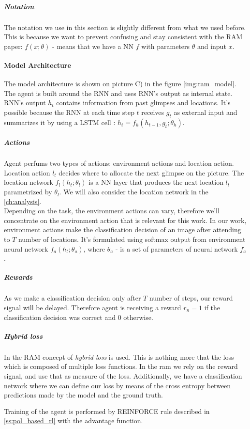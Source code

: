 \subparagraph{Notation} The notation we use in this section is slightly different from what
we used before. This is because we want to prevent confusing and stay consistent
with the \gls{RAM} paper: $f (x; \theta)$ - means that we have a \gls{NN} $f$
with parameters $\theta$ and input $x$.


\paragraph{Model Architecture} The model architecture is shown
on picture C) in the figure \ref{img:ram_model}. The agent is built around
the RNN and uses RNN's output as internal state. RNN's output $h_t$ contains
information from past glimpses and locations. It's possible
because the RNN at each time step $t$ receives $g_t$ as external input and
summarizes it by using a LSTM cell : $h_t = f_h(h_{t-1}, g_t; \theta_h)$.

\subparagraph{Actions} Agent perfums two types of actions: environment actions
and location action. Location action $l_t$ decides where to allocate the next glimpse
on the picture. The location network $f_l(h_t; \theta_l)$ is a NN layer
that produces the next location $l_t$ parametrized by $\theta_l$. We will also consider the
location network in the \autoref{ch:analysis}. \\
Depending on the task, the environment actions can vary, therefore
we'll concentrate on the environment action that is relevant for this work.
In our work, environment actions make the classification decision of an image
after attending to $T$ number of locations.
It's formulated using softmax output from environment neural network
 $f_a(h_t; \theta_a)$, where $\theta_a$ - is a set of parameters of neural network $f_a$.

\subparagraph{Rewards} As we make a classification decision only after $T$
number of steps, our reward signal will be delayed. Therefore agent is receiving
a reward $r_n = 1$ if the classification decision was correct and $0$ otherwise.

\subparagraph{Hybrid loss} In the RAM concept of \emph{hybrid loss} is used.
This is nothing more that the loss which is composed of multiple loss functions.
In the ram we rely on the reward signal, and use that as measure of the loss.
Additionally, we have a classification network where we can define our loss
by means of the cross entropy between predictions made by the model and the ground truth.


Training of the agent is performed by REINFORCE rule
described in \autoref{ss:pol_based_rl} with the advantage function.



